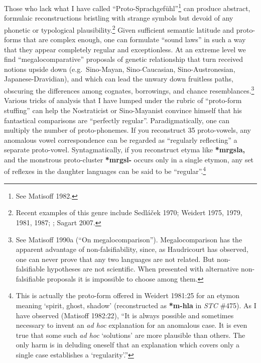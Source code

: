 Those who lack what I have called “Proto-Sprachgefühl”\footnote{See
Matisoff 1982.} can produce abstract, formulaic reconstructions bristling with
strange symbols but devoid of any phonetic or typological
plausibility.\footnote{Recent examples of this genre include Sedláček
1970; Weidert 1975, 1979, 1981, 1987; \citealt{PS-STL}; Sagart 2007.} 
Given sufficient semantic latitude and proto-forms that are complex enough, one
can formulate “sound laws” in such a way that they appear completely regular and
exceptionless. At an extreme level we find “megalocomparative” proposals of
genetic relationship that turn received notions upside down (e.g.\ Sino-Mayan,
Sino-Caucasian, Sino-Austronesian, Japanese-Dravidian), and which can lead the
unwary down fruitless paths, obscuring the differences among cognates,
borrowings, and chance resemblances.\footnote{See Matisoff 1990a (“On
megalocomparison”). Megalocomparison has the apparent advantage of
non-falsifiability, since, as Haudricourt has observed, one can never prove that
any two languages are not related. But non-falsifiable hypotheses are not
scientific. When presented with alternative non-falsifiable proposals it is
impossible to choose among them.} Various tricks of analysis that I have lumped
under the rubric of “proto-form stuffing” can help the Nostraticist or
Sino-Mayanist convince himself that his fantastical comparisons are “perfectly
regular”. Paradigmatically, one can multiply the number of proto-phonemes. If
you reconstruct 35 proto-vowels, any anomalous vowel correspondence can be
regarded as “regularly reflecting” a separate proto-vowel. Syntagmatically, if
you reconstruct etyma like \textbf{*mrgsla,} and the monstrous proto-cluster
\textbf{*mrgsl-}
occurs only in a single etymon, any set of reflexes in the daughter languages
can be said to be “regular”.\footnote{This is actually the proto-form offered
in Weidert 1981:25 for an etymon meaning ‘spirit, ghost, shadow’ (reconstructed
as \textbf{*m-hla} in \textit{STC} \#475). As I have observed (Matisoff 1982:22), “It is always
possible and sometimes necessary to invent an \textit{ad hoc} explanation for an
anomalous case. It is even true that some such \textit{ad hoc} ‘solutions’ are more
plausible than others. The only harm is in deluding oneself that an explanation
which covers only a single case establishes a ‘regularity’.”}


